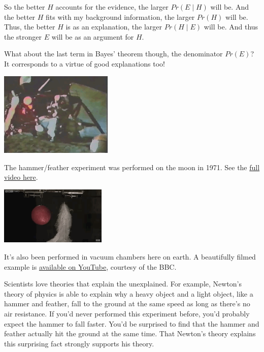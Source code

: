 \documentclass[justified]{tufte-book}
\newcommand{\given}{\mid}
\newcommand{\p}{Pr}
\theoremstyle{definition}
\theoremstyle{definition}
\theoremstyle{definition}
\theoremstyle{remark}
\begin{document}
So the better \(H\) accounts for the evidence, the larger
\(\p(E \given H)\) will be. And the better \(H\) fits with my background
information, the larger \(\p(H)\) will be. Thus, the better \(H\) is as
an explanation, the larger \(\p(H \given E)\) will be. And thus the
stronger \(E\) will be as an argument for \(H\).

What about the last term in Bayes' theorem though, the denominator
\(\p(E)\)? It corresponds to a virtue of good explanations too!









\begin{marginfigure}
\includegraphics[width=2.12in]{img/moon} \caption[The hammer/feather experiment was performed on the moon
in 1971. See the \href{https://bit.ly/1KLQzOB}{full video here}.]{The hammer/feather experiment was performed on the moon
in 1971. See the \href{https://bit.ly/1KLQzOB}{full video here}.}\label{fig:unnamed-chunk-87}
\end{marginfigure}
\begin{marginfigure}
\includegraphics[width=2in]{img/vacuum} \caption[It's also been performed in vacuum chambers here on
earth. A beautifully filmed example is
\href{https://bit.ly/10hw8mP}{available on YouTube}, courtesy of the
BBC.]{It's also been performed in vacuum chambers here on
earth. A beautifully filmed example is
\href{https://bit.ly/10hw8mP}{available on YouTube}, courtesy of the
BBC.}\label{fig:unnamed-chunk-87}
\end{marginfigure}

Scientists love theories that explain the unexplained. For example,
Newton's theory of physics is able to explain why a heavy object and a
light object, like a hammer and feather, fall to the ground at the same
speed as long as there's no air resistance. If you'd never performed
this experiment before, you'd probably expect the hammer to fall faster.
You'd be surprised to find that the hammer and feather actually hit the
ground at the same time. That Newton's theory explains this surprising
fact strongly supports his theory.
\end{document}
